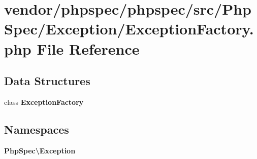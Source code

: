 \section{vendor/phpspec/phpspec/src/\+Php\+Spec/\+Exception/\+Exception\+Factory.php File Reference}
\label{_exception_factory_8php}
\subsection*{Data Structures}
\begin{DoxyCompactItemize}
\item 
class {\bf Exception\+Factory}
\end{DoxyCompactItemize}
\subsection*{Namespaces}
\begin{DoxyCompactItemize}
\item 
 {\bf Php\+Spec\textbackslash{}\+Exception}
\end{DoxyCompactItemize}
